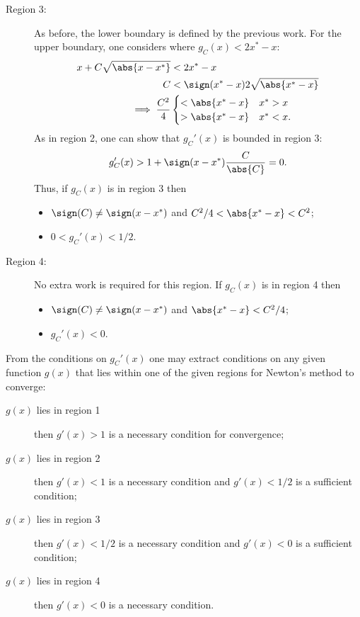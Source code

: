 \documentclass{article}
\begin{document}
\begin{description}
\item[Region 3:] As before, the lower boundary is defined by the previous work.
For the upper boundary, one considers where $g_C(x) < 2x^* - x$:
\begin{align*}
x + C \sqrt{\abs{x-x^*}} & < 2 x^* - x \\
					C 	 & < \sign(x^*-x) 2 \sqrt{\abs{x^*-x}} \\
  \implies \frac{C^2}{4} & \begin{cases} < \abs{x^*-x} & x^* > x \\ > \abs{x^*-x} & x^* < x . \end{cases}
\end{align*}
As in region 2, one can show that $g_C'(x)$ is bounded in region 3:
\begin{equation*}
g_C'(x) > 1 + \sign(x-x^*) \frac{C}{\abs{C}} = 0.
\end{equation*}
Thus, if $g_C(x)$ is in region 3 then \begin{itemize}
\item $\sign(C) \neq \sign(x-x^*)$ and $C^2/4 < \abs{x^*-x} < C^2$;
\item $0 < g_C'(x) < 1/2$.
\end{itemize}

\item[Region 4:] No extra work is required for this region.
If $g_C(x)$ is in region 4 then \begin{itemize}
\item $\sign(C) \neq \sign(x-x^*)$ and $\abs{x^* - x} < C^2/4$;
\item $g_C'(x) < 0$.
\end{itemize}
\end{description}

From the conditions on $g_C'(x)$ one may extract conditions on any given function $g(x)$ that lies within one of the given regions for Newton's method to converge:
\begin{description}
\item[$g(x)$ lies in region 1] then $g'(x) > 1$ is a necessary condition for convergence;
\item[$g(x)$ lies in region 2] then $g'(x) < 1$ is a necessary condition and $g'(x) < 1/2$ is a sufficient condition;
\item[$g(x)$ lies in region 3] then $g'(x) < 1/2$ is a necessary condition and $g'(x) < 0$ is a sufficient condition;
\item[$g(x)$ lies in region 4] then $g'(x) < 0$ is a necessary condition.
\end{description}
\end{document}
